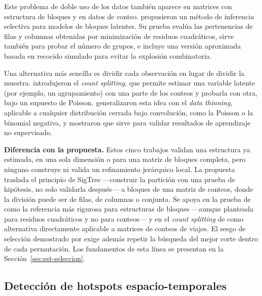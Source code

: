 Este problema de doble uso de los datos también aparece en matrices con
estructura de bloques y en datos de conteo. \cite{Watanabe2021si}
propusieron un método de inferencia selectiva para modelos de bloques
latentes. Su prueba evalúa las pertenencias de filas y columnas obtenidas
por minimización de residuos cuadráticos, sirve también para probar el
número de grupos, e incluye una versión aproximada basada en recocido
simulado para evitar la explosión combinatoria.

Una alternativa más sencilla es dividir cada observación en lugar de
dividir la muestra. \cite{Neufeld2024cs} introdujeron el \emph{count
splitting}, que permite estimar una variable latente (por ejemplo, un
agrupamiento) con una parte de los conteos y probarla con otra, bajo un
supuesto de Poisson. \cite{Neufeld2024dt} generalizaron esta idea con el
\emph{data thinning}, aplicable a cualquier distribución cerrada bajo
convolución, como la Poisson o la binomial negativa, y mostraron que sirve
para validar resultados de aprendizaje no supervisado.

\textbf{Diferencia con la propuesta.} Estos cinco trabajos validan una
estructura ya estimada, en una sola dimensión o para una matriz de bloques
completa, pero ninguno construye ni valida un refinamiento jerárquico
local. La propuesta traslada el principio de SigTree —construir la
partición con una prueba de hipótesis, no solo validarla después— a
bloques de una matriz de conteos, donde la división puede ser de filas, de
columnas o conjunta. Se apoya en la prueba de \cite{Watanabe2021si} como la
referencia más rigurosa para estructuras de bloques —aunque planteada para
residuos cuadráticos y no para conteos— y en el \emph{count splitting} de
\cite{Neufeld2024cs} como alternativa directamente aplicable a matrices de
conteos de viajes. El sesgo de selección demostrado por \cite{Gao2024}
exige además repetir la búsqueda del mejor corte dentro de cada
permutación. Los fundamentos de esta línea se presentan en la
Sección~\ref{sec:est-seleccion}.

\subsection{Detección de hotspots espacio-temporales}
\label{sec:ea_hotspots}


